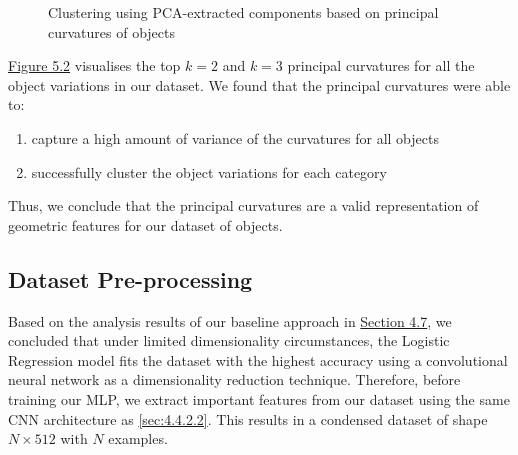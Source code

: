 \documentclass[11pt, a4paper]{report}
\begin{document}
\vspace*{-0.7cm}
\begin{figure}[H]%
    \centering
    \qquad
    \caption{Clustering using PCA-extracted components based on principal curvatures of objects}%
    \label{fig:5.2}%
\end{figure}

\hyperref[fig:5.2]{Figure 5.2} visualises the top $k=2$ and $k=3$ principal curvatures for all the object variations in our dataset. We found that the principal curvatures were able to:
\begin{enumerate}[\itemsep=0em]
    \item capture a high amount of variance of the curvatures for all objects
    \item successfully cluster the object variations for each category
\end{enumerate}
\noindent Thus, we conclude that the principal curvatures are a valid representation of geometric features for our dataset of objects.


\subsection{Dataset Pre-processing}\label{sec:5.2.4}
Based on the analysis results of our baseline approach in \hyperref[sec:4.7]{Section 4.7}, we concluded that under limited dimensionality circumstances, the Logistic Regression model fits the dataset with the highest accuracy using a convolutional neural network as a dimensionality reduction technique. Therefore, before training our MLP, we extract important features from our dataset using the same CNN architecture as \ref{sec:4.4.2.2}. This results in a condensed dataset of shape $N\times512$ with $N$ examples.\\
\end{document}
